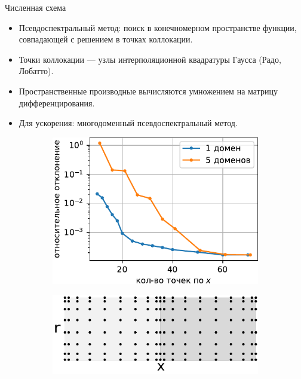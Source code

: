 \documentclass{beamer}
\newcommand{\vect}[1]{\underline{#1}}
\begin{document}
\begin{frame}{Численная схема}
\begin{itemize}
	\item Псевдоспектральный метод: поиск в конечномерном пространстве функции, совпадающей с решением в точках коллокации.
	\item Точки коллокации --- узлы интерполяционной квадратуры Гаусса (Радо, Лобатто).
	\item Пространственные производные вычисляются умножением на матрицу дифференцирования.
	\item Для ускорения: многодоменный псевдоспектральный метод.
\end{itemize}
\begin{figure}[h!]
	\centering
	\begin{subfigure}{0.45\linewidth}
	\flushleft
	\includegraphics[width=\linewidth]{figures/Error}
	\end{subfigure}
	\begin{subfigure}{0.4\linewidth}
	\centering
	\hspace*{2mm} \includegraphics[width=\linewidth]{figures/Grid2D}

\end{subfigure}
\end{figure}
\end{frame}
\end{document}

